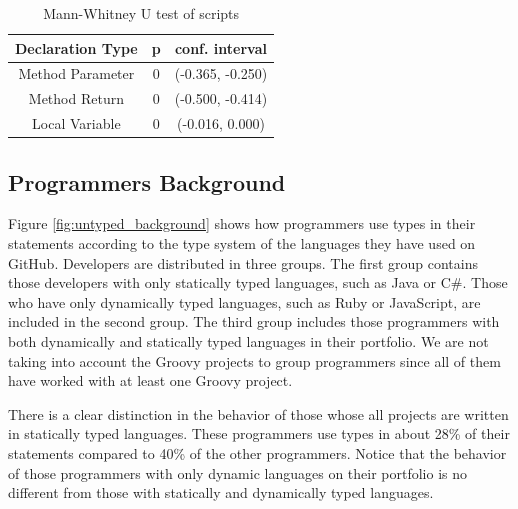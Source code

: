 \documentclass[preprint]{sigplanconf}
\begin{document}
\begin{table}[ht]
\centering{}%
\begin{tabular}{|c|c|c|}
\hline 
Declaration Type & p & conf. interval \\
\hline 
\hline 
Method Parameter              & 0	& (-0.365, -0.250) \\ \hline
Method Return                 & 0	& (-0.500, -0.414) \\ \hline
Local Variable                & 0	& (-0.016, 0.000)  \\ \hline
\hline 
\end{tabular}
\label{tab:number_of_developers}
\caption{Mann-Whitney U test of scripts}
\end{table}

\subsection{Programmers Background\label{res-background}}

Figure \ref{fig:untyped_background} shows how programmers use types in their statements according to the type system of the languages they have used on GitHub.
Developers are distributed in three groups.
The first group contains those developers with only statically typed languages, such as Java or C\#.
Those who have only dynamically typed languages, such as Ruby or JavaScript, are included in the second group.
The third group includes those programmers with both dynamically and statically typed languages in their portfolio.
We are not taking into account the Groovy projects to group programmers since all of them have worked with at least one Groovy project.

There is a clear distinction in the behavior of those whose all projects are written in statically typed languages.
These programmers use types in about 28\% of their statements compared to 40\% of the other programmers.
Notice that the behavior of those programmers with only dynamic languages on their portfolio is no different from those with statically and dynamically typed languages.
\end{document}
